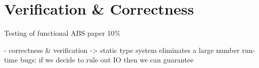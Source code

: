 \chapter{Verification \& Correctness}
Testing of functional ABS paper
10\%

- correctness \& verification
	-> static type system eliminates a large number run-time bugs: if we decide to rule out IO then we can guarantee 
